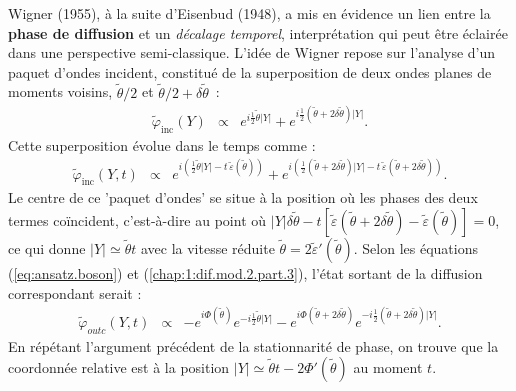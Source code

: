 Wigner (1955), à la suite d’Eisenbud (1948), a mis en évidence un lien entre la {\bf phase de diffusion} et un {\em décalage temporel}, interprétation qui peut être éclairée dans une perspective semi-classique. L’idée de Wigner repose sur l’analyse d’un paquet d’ondes incident, constitué de la superposition de deux ondes planes de moments voisins, $\tilde{\theta}/2$ et $\tilde{\theta}/2 + \delta \tilde{\theta}$ :
\begin{eqnarray}
	\tilde{\varphi}_{\text{inc}}(Y) & \propto & e^{i\frac{1}{2}\tilde{\theta} \vert Y\vert} + e^{i\frac{1}{2}\left(\tilde{\theta} + 2\delta \tilde{\theta} \right) \vert Y\vert}.
\end{eqnarray}
Cette superposition évolue dans le temps comme :
\begin{eqnarray}
\tilde{\varphi}_{\text{inc}}(Y, t) &\propto &  e^{i\left( \frac{1}{2} \tilde{\theta}\vert Y\vert - t\,\tilde{\varepsilon}(\tilde{\theta}) \right)} + e^{i\left( \frac{1}{2}\left(  \tilde{\theta} + 2\delta \tilde{\theta} \right) \vert Y\vert - t\,\tilde{\varepsilon}(\tilde{\theta} + 2\delta \tilde{\theta}) \right)}.
\end{eqnarray}
Le centre de ce 'paquet d'ondes' se situe à la position où les phases des deux termes coïncident, c'est-à-dire au point où $\vert Y\vert\delta \tilde{\theta}  - t[\tilde{\varepsilon}(\tilde{\theta} + 2\delta \tilde{\theta} ) - \tilde{\varepsilon}(\tilde{\theta})] = 0$, ce qui donne $\vert Y\vert \simeq \tilde{\theta} t$ avec la vitesse réduite $\tilde{\theta} = 2 \tilde{\varepsilon}'(\tilde{\theta}) $. %
Selon les équations (\ref{eq:ansatz.boson}) et (\ref{chap:1:dif.mod.2.part.3}), l'état sortant de la diffusion correspondant serait :
\begin{eqnarray}
	\tilde{\varphi}_{outc} ( Y, t ) & \propto & -e^{i\Phi(\tilde{\theta})}e^{-i\frac{1}{2}\tilde{\theta} \vert Y\vert} - e^{i\Phi(\tilde{\theta} + 2 \delta \tilde{\theta} )}e^{-i\frac{1}{2}\left(\tilde{\theta} + 2\delta \tilde{\theta} \right) \vert Y\vert}. %
\end{eqnarray}
En répétant l'argument précédent de la stationnarité de phase, on trouve que la coordonnée relative est à la position $\vert Y \vert  \simeq \tilde{\theta} t - 2\Phi'( \tilde{\theta})$ au moment $t$. %
